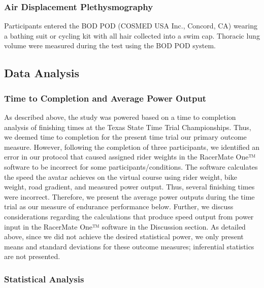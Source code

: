\documentclass[]{cik}%
\begin{document}
\hypertarget{air-displacement-plethysmography}{%
\subsubsection{Air Displacement
Plethysmography}\label{air-displacement-plethysmography}}

Participants entered the BOD POD (COSMED USA Inc., Concord, CA) wearing
a bathing suit or cycling kit with all hair collected into a swim cap.
Thoracic lung volume were measured during the test using the BOD POD
system.

\hypertarget{data-analysis}{%
\subsection{Data Analysis}\label{data-analysis}}

\hypertarget{time-to-completion-and-average-power-output}{%
\subsubsection{Time to Completion and Average Power
Output}\label{time-to-completion-and-average-power-output}}

As described above, the study was powered based on a time to completion
analysis of finishing times at the Texas State Time Trial Championships.
Thus, we deemed time to completion for the present time trial our
primary outcome measure. However, following the completion of three
participants, we identified an error in our protocol that caused
assigned rider weights in the RacerMate One™ software to be incorrect
for some participants/conditions. The software calculates the speed the
avatar achieves on the virtual course using rider weight, bike weight,
road gradient, and measured power output. Thus, several finishing times
were incorrect. Therefore, we present the average power outputs during
the time trial as our measure of endurance performance below. Further,
we discuss considerations regarding the calculations that produce speed
output from power input in the RacerMate One™ software in the Discussion
section. As detailed above, since we did not achieve the desired
statistical power, we only present means and standard deviations for
these outcome measures; inferential statistics are not presented.

\hypertarget{statistical-analysis}{%
\subsubsection{Statistical Analysis}\label{statistical-analysis}}
\end{document}
